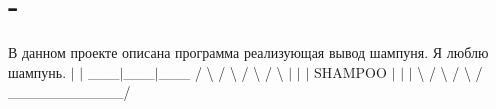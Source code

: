 \chapter{-\/}
\hypertarget{md__r_e_a_d_m_e}{}\label{md__r_e_a_d_m_e}
\label{md__r_e_a_d_m_e_autotoc_md0}%
%


В данном проекте описана программа реализующая вывод шампуня. Я люблю шампунь. 
 \texorpdfstring{$\vert$}{|} \texorpdfstring{$\vert$}{|} \+\_\+\+\_\+\+\_\+\texorpdfstring{$\vert$}{|}\+\_\+\+\_\+\+\_\+\texorpdfstring{$\vert$}{|}\+\_\+\+\_\+\+\_\+ / \textbackslash{} / \textbackslash{} / \textbackslash{} / \textbackslash{} \texorpdfstring{$\vert$}{|} \texorpdfstring{$\vert$}{|} \texorpdfstring{$\vert$}{|} SHAMPOO \texorpdfstring{$\vert$}{|} \texorpdfstring{$\vert$}{|} \texorpdfstring{$\vert$}{|} \textbackslash{} / \textbackslash{} / \textbackslash{} / \+\_\+\+\_\+\+\_\+\+\_\+\+\_\+\+\_\+\+\_\+\+\_\+\+\_\+\+\_\+\+\_\+/ 